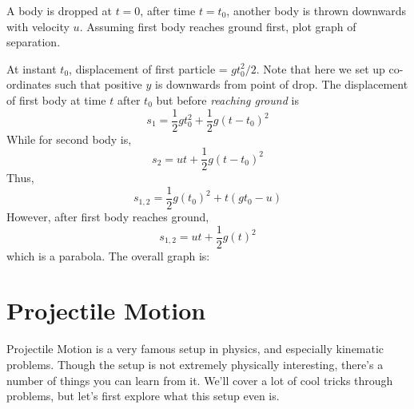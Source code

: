 \begin{example}
    A body is dropped at $t = 0$, after time $t = t_0$, another body is thrown downwards with velocity 
    $u$. Assuming first body reaches ground first, plot graph of separation.
    \begin{soln}
        At instant $t_0$, displacement of first particle = ${gt_0^2}/{2}$. Note that here we set up 
        co-ordinates such that positive $y$ is downwards from point of drop. 
        The displacement of first body at time $t$ after $t_0$ but before \textit{reaching ground} is
        \[
        s_1 = \frac{1}{2}gt_0^2 + \frac{1}{2}g(t - t_0)^2
        \]
        While for second body is,
        \[
        s_2 = ut + \frac{1}{2}g(t - t_0)^2 
        \]
        Thus,
        \[
        s_{1,2} = \frac{1}{2}g(t_0)^2 + t(g t_0 - u) 
        \]
        However, after first body reaches ground,
        \[
        s_{1,2} = ut + \frac{1}{2}g(t)^2 
        \]
        which is a parabola. The overall graph is:
        \begin{center}
        \end{center}
    
    \end{soln}
\end{example}

\newpage
\section{Projectile Motion}

    Projectile Motion is a very famous setup in physics, and especially kinematic
    problems. Though the setup is not extremely physically interesting, there's a 
    number of things you can learn from it. We'll cover a lot of cool tricks through
    problems, but let's first explore what this setup even is.

